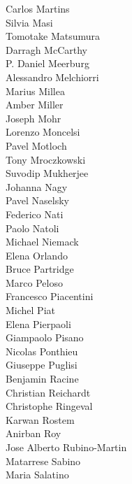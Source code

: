 \documentclass[PICOAPC.tex]{subfiles}
\begin{document}
{\begin{multicols}{4}
Carlos Martins                  \\
Silvia Masi                     \\
Tomotake Matsumura              \\
Darragh McCarthy                \\
P. Daniel Meerburg              \\
Alessandro Melchiorri           \\
Marius Millea                   \\
Amber Miller                    \\
Joseph Mohr                     \\
Lorenzo Moncelsi                \\
Pavel Motloch                   \\
Tony Mroczkowski                \\
Suvodip Mukherjee               \\
Johanna Nagy                    \\
Pavel Naselsky                  \\
Federico Nati                   \\
Paolo Natoli                    \\
Michael Niemack                 \\
Elena Orlando                   \\
Bruce Partridge                 \\
Marco Peloso                    \\
Francesco Piacentini            \\
Michel Piat                     \\
Elena Pierpaoli   \\
Giampaolo Pisano                \\
Nicolas Ponthieu                \\
Giuseppe Puglisi                \\
Benjamin Racine                 \\
Christian Reichardt             \\
Christophe Ringeval             \\
Karwan Rostem                   \\
Anirban Roy                     \\
Jose Alberto Rubino-Martin      \\
Matarrese Sabino                \\
Maria Salatino                  \\

\end{multicols}}
\end{document}

